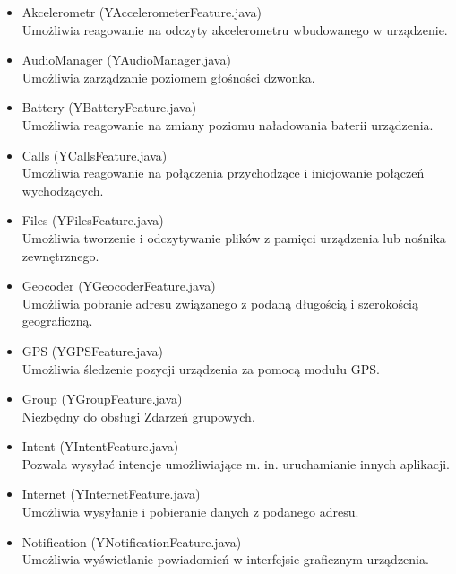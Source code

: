 \documentclass[11pt,a4paper,polish,thesis]{dcsbook}
\begin{document}
\begin{itemize}
\item{Akcelerometr (YAccelerometerFeature.java)} \\
Umożliwia reagowanie na odczyty akcelerometru wbudowanego w urządzenie. 

\item{AudioManager (YAudioManager.java)}\\
Umożliwia zarządzanie poziomem głośności dzwonka.

\item{Battery (YBatteryFeature.java)}\\
Umożliwia reagowanie na zmiany poziomu naładowania baterii urządzenia.

\item{Calls (YCallsFeature.java)}\\
Umożliwia reagowanie na połączenia przychodzące i inicjowanie połączeń wychodzących.

\item{Files (YFilesFeature.java)}\\
Umożliwia tworzenie i odczytywanie plików z pamięci urządzenia lub nośnika zewnętrznego.

\item{Geocoder (YGeocoderFeature.java)}\\
Umożliwia pobranie adresu związanego z podaną długością i szerokością geograficzną.

\item{GPS (YGPSFeature.java)}\\
Umożliwia śledzenie pozycji urządzenia za pomocą modułu GPS.

\item{Group (YGroupFeature.java)}\\
Niezbędny do obsługi Zdarzeń grupowych.

\item{Intent (YIntentFeature.java)}\\
Pozwala wysyłać intencje\cite{android.intent} umożliwiające m. in. uruchamianie innych aplikacji.

\item{Internet (YInternetFeature.java)}\\
Umożliwia wysyłanie i pobieranie danych z podanego adresu.

\item{Notification (YNotificationFeature.java)}\\
Umożliwia wyświetlanie powiadomień w interfejsie graficznym urządzenia.


\end{itemize}
\end{document}
